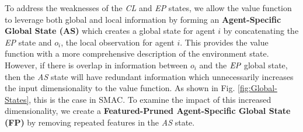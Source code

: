 \documentclass{article}
\theoremstyle{plain}
\theoremstyle{definition}
\theoremstyle{remark}
\begin{document}
To address the weaknesses of the \emph{CL} and \emph{EP} states, we allow the value function to leverage both global and local information by forming an \textbf{Agent-Specific Global State (AS)} which creates a global state for agent $i$ by concatenating the \emph{EP} state and $o_i$, the local observation for agent $i$. This provides the value function with a more comprehensive description of the environment state. However, if there is overlap in information between $o_i$ and the $\emph{EP}$ global state, then the \emph{AS} state will have redundant information which unnecessarily increases the input dimensionality to the value function. As shown in Fig. \ref{fig:Global-States}, this is the case in SMAC. To examine the impact of this increased dimensionality, we  create a \textbf{Featured-Pruned Agent-Specific Global State (FP)} by removing repeated features in the \emph{AS} state.






\end{document}
